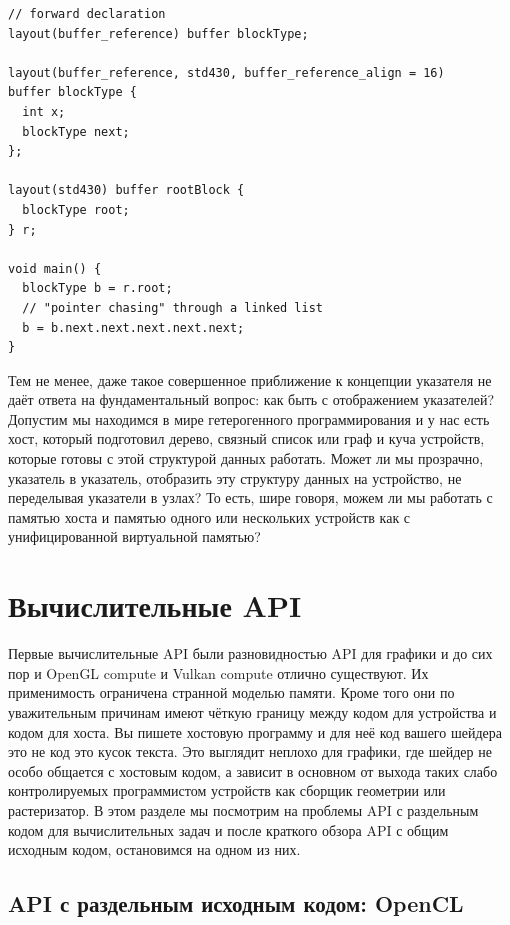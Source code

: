 \documentclass[a4paper,12pt,oneside]{article}
\begin{document}
\begin{lstlisting}[caption={Работа с device pointers на GLSL},label={lst:devptrs}]
// forward declaration
layout(buffer_reference) buffer blockType;

layout(buffer_reference, std430, buffer_reference_align = 16) 
buffer blockType {
  int x;
  blockType next;
};

layout(std430) buffer rootBlock {
  blockType root;
} r;

void main() {
  blockType b = r.root;
  // "pointer chasing" through a linked list
  b = b.next.next.next.next.next;
}
\end{lstlisting}

Тем не менее, даже такое совершенное приближение к концепции указателя не даёт ответа на фундаментальный вопрос: как быть с отображением указателей? 
Допустим мы находимся в мире гетерогенного программирования и у нас есть хост, который подготовил дерево, связный список или граф и куча устройств, которые готовы с этой структурой данных работать.
Может ли мы прозрачно, указатель в указатель, отобразить эту структуру данных на устройство, не переделывая указатели в узлах?
То есть, шире говоря, можем ли мы работать с памятью хоста и памятью одного или нескольких устройств как с унифицированной виртуальной памятью?

\pagebreak
\section{Вычислительные API}\label{sec:SingleSource}

Первые вычислительные API были разновидностью API для графики и до сих пор и OpenGL compute и Vulkan compute отлично существуют.
Их применимость ограничена странной моделью памяти.
Кроме того они по уважительным причинам имеют чёткую границу между кодом для устройства и кодом для хоста.
Вы пишете хостовую программу и для неё код вашего шейдера это не код это кусок текста.
Это выглядит неплохо для графики, где шейдер не особо общается с хостовым кодом, а зависит в основном от выхода таких слабо контролируемых программистом устройств как сборщик геометрии или растеризатор.
В этом разделе мы посмотрим на проблемы API с раздельным кодом для вычислительных задач и после краткого обзора API с общим исходным кодом, остановимся на одном из них.

\subsection{API с раздельным исходным кодом: OpenCL}\label{subsec:opencl}
\end{document}
